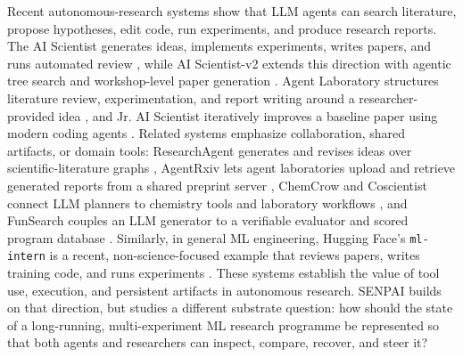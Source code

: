 \documentclass{article}
\begin{document}
Recent autonomous-research systems show that LLM agents can search literature, propose hypotheses, edit code, run experiments, and produce research reports. The AI Scientist generates ideas, implements experiments, writes papers, and runs automated review \citep{lu2024aiscientist,sakana2024aiscientist}, while AI Scientist-v2 extends this direction with agentic tree search and workshop-level paper generation \citep{yamada2025aiscientistv2,sakana2025aiscientistv2}. Agent Laboratory structures literature review, experimentation, and report writing around a researcher-provided idea \citep{schmidgall2025agentlaboratory}, and Jr. AI Scientist iteratively improves a baseline paper using modern coding agents \citep{miyai2026jraiscientist}. Related systems emphasize collaboration, shared artifacts, or domain tools: ResearchAgent generates and revises ideas over scientific-literature graphs \citep{baek2024researchagent}, AgentRxiv lets agent laboratories upload and retrieve generated reports from a shared preprint server \citep{schmidgall2025agentrxiv}, ChemCrow and Coscientist connect LLM planners to chemistry tools and laboratory workflows \citep{bran2024chemcrow,boiko2023coscientist}, and FunSearch couples an LLM generator to a verifiable evaluator and scored program database \citep{romeraparedes2024funsearch}. Similarly, in general ML engineering, Hugging Face's \texttt{ml-intern} is a recent, non-science-focused example that reviews papers, writes training code, and runs experiments \citep{huggingface2026mlintern}. These systems establish the value of tool use, execution, and persistent artifacts in autonomous research. SENPAI builds on that direction, but studies a different substrate question: how should the state of a long-running, multi-experiment ML research programme be represented so that both agents and researchers can inspect, compare, recover, and steer it?
\end{document}
